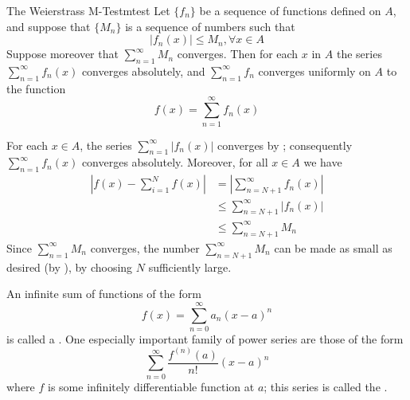 \documentclass[12pt]{report}
\begin{document}
\begin{namthm}{The Weierstrass M-Test}{mtest}
    Let $\{f_n\}$ be a sequence of functions defined on $A$, and suppose that $\{M_n\}$ is a sequence of numbers such that \begin{equation*}
        |f_n(x)|\leq M_n,\forall x \in A
    \end{equation*}
    Suppose moreover that $\sum\limits_{n=1}^{\infty}M_n$ converges. Then for each $x$ in $A$ the series $\sum\limits_{n=1}^{\infty}f_n(x)$ converges absolutely, and $\sum\limits_{n=1}^{\infty}f_n$ converges uniformly on $A$ to the function \begin{equation*}
        f(x) = \sum\limits_{n=1}^{\infty}f_n(x)
    \end{equation*}
\end{namthm}
\begin{proof*}{}{}
    For each $x \in A$, the series $\sum\limits_{n=1}^{\infty}|f_n(x)|$ converges by ; consequently $\sum\limits_{n=1}^{\infty}f_n(x)$ converges absolutely. Moreover, for all $x \in A$ we have \begin{align*}
        \left|f(x) - \sum\limits_{i=1}^{N}f(x)\right| &= \left|\sum\limits_{n=N+1}^{\infty}f_n(x)\right| \\
        &\leq \sum\limits_{n=N+1}^{\infty}|f_n(x)| \\
        &\leq \sum\limits_{n=N+1}^{\infty}M_n
    \end{align*}
    Since $\sum\limits_{n=1}^{\infty}M_n$ converges, the number $\sum\limits_{n=N+1}^{\infty}M_n$ can be made as small as desired (by ), by choosing $N$ sufficiently large.
\end{proof*}




\begin{defn}{}{}
    An infinite sum of functions of the form \begin{equation*}
        f(x) = \sum\limits_{n=0}^{\infty}a_n(x-a)^n
    \end{equation*}
    is called a . One especially important family of power series are those of the form \begin{equation*}
        \sum\limits_{n=0}^{\infty}\frac{f^{(n)}(a)}{n!}(x-a)^n
    \end{equation*}
    where $f$ is some infinitely differentiable function at $a$; this series is called the .
\end{defn}
\end{document}
